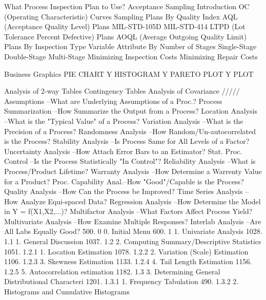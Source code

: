 What Process Inspection Plan to Use?
Acceptance Sampling
   Introduction
   OC (Operating Characteristic) Curves
   Sampling Plans
      By Quality Index
         AQL (Acceptance Quality Level) Plans
            MIL-STD-105D
            MIL-STD-414
         LTPD (Lot Tolerance Percent Defective) Plans
         AOQL (Average Outgoing Quality Limit) Plans
      By Inspection Type
         Variable
         Attribute
      By Number of Stages
         Single-Stage
         Double-Stage
         Multi-Stage
   Minimizing Inspection Costs
   Minimizing Repair Costs
 
Business Graphics
   PIE CHART Y
   HISTOGRAM Y
   PARETO PLOT Y
   PLOT
 
Analysis of 2-way Tables
Contingency Tables
Analysis of Covariance
/////
Assumptions           --What are Underlying Assumptions of a Proc.?
Process Summarization --How Summarize the Output from a Process?
Location Analysis     --What is the "Typical Value" of a Process?
Variation Analysis    --What is the Precision of a Process?
Randomness Analysis   --How Random/Un-autocorrelated is the Process?
Stability Analysis    --Is Process Same for All Levels of a Factor?
Uncertainty Analysis  --How Attach Error Bars to an Estimator?
Stat. Proc. Control   --Is the Process Statistically "In Control"?
Reliability Analysis  --What is Process/Product Lifetime?
Warranty Analysis     --How Determine a Warrenty Value for a Product?
Proc. Capability Anal.--How "Good"/Capable is the Process?
Quality Analysis      --How Can the Process be Improved?
Time Series Analysis  --How Analyze Equi-spaced Data?
Regression Analysis   --How Determine the Model in Y = f(X1,X2,...)?
Multifactor Analysis  --What Factors Affect Process Yield?
Multivariate Analysis --How Examine Multiple Responses?
Interlab Analysis     --Are All Labs Equally Good?
500.      0           0. Initial Menu
600.      1               1. Univariate Analysis
1028.     1.1                   1. General Discussion
1037.     1.2                   2. Computing Summary/Descriptive Statistics
1051.     1.2.1                       1. Location Estimation
1078.     1.2.2                       2. Variation (Scale) Estimation
1106.     1.2.3                       3. Skewness Estimation
1133.     1.2.4                       4. Tail Length Estimation
1156.     1.2.5                       5. Autocorrelation estimation
1182.     1.3                   3. Determining General Distributional Characteri
1201.     1.3.1                       1. Frequency Tabulation
490.      1.3.2                       2. Histograms and Cumulative Histograms
